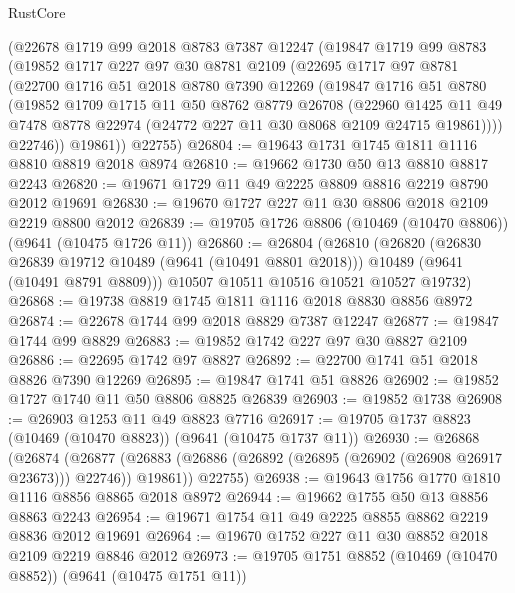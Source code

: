 \begin{lexlean}{RustCore}
\begin{coremodule}
    (@22678
      @1719
      @99
      @2018
      @8783
      @7387
      @12247
      (@19847
        @1719
        @99
        @8783
        (@19852
          @1717
          @227
          @97
          @30
          @8781
          @2109
          (@22695
            @1717
            @97
            @8781
            (@22700
              @1716
              @51
              @2018
              @8780
              @7390
              @12269
              (@19847
                @1716
                @51
                @8780
                (@19852
                  @1709
                  @1715
                  @11
                  @50
                  @8762
                  @8779
                  @26708
                  (@22960
                    @1425
                    @11
                    @49
                    @7478
                    @8778
                    @22974
                    (@24772 @227 @11 @30 @8068 @2109 @24715 @19861))))
              @22746))
          @19861))
      @22755)
@26804 := @19643 @1731 @1745 @1811 @1116 @8810 @8819 @2018 @8974
@26810 := @19662 @1730 @50 @13 @8810 @8817 @2243
@26820 := @19671 @1729 @11 @49 @2225 @8809 @8816 @2219 @8790 @2012 @19691
@26830 := @19670 @1727 @227 @11 @30 @8806 @2018 @2109 @2219 @8800 @2012
@26839 := @19705 @1726 @8806 (@10469 (@10470 @8806)) (@9641 (@10475 @1726 @11))
@26860 := @26804
    (@26810
      (@26820
        (@26830 @26839 @19712 @10489 (@9641 (@10491 @8801 @2018)))
        @10489
        (@9641 (@10491 @8791 @8809)))
      @10507
      @10511
      @10516
      @10521
      @10527
      @19732)
@26868 := @19738 @8819 @1745 @1811 @1116 @2018 @8830 @8856 @8972
@26874 := @22678 @1744 @99 @2018 @8829 @7387 @12247
@26877 := @19847 @1744 @99 @8829
@26883 := @19852 @1742 @227 @97 @30 @8827 @2109
@26886 := @22695 @1742 @97 @8827
@26892 := @22700 @1741 @51 @2018 @8826 @7390 @12269
@26895 := @19847 @1741 @51 @8826
@26902 := @19852 @1727 @1740 @11 @50 @8806 @8825 @26839
@26903 := @19852 @1738
@26908 := @26903 @1253 @11 @49 @8823 @7716
@26917 := @19705 @1737 @8823 (@10469 (@10470 @8823)) (@9641 (@10475 @1737 @11))
@26930 := @26868
    (@26874
      (@26877 (@26883 (@26886 (@26892 (@26895 (@26902 (@26908 @26917 @23673))) @22746)) @19861))
      @22755)
@26938 := @19643 @1756 @1770 @1810 @1116 @8856 @8865 @2018 @8972
@26944 := @19662 @1755 @50 @13 @8856 @8863 @2243
@26954 := @19671 @1754 @11 @49 @2225 @8855 @8862 @2219 @8836 @2012 @19691
@26964 := @19670 @1752 @227 @11 @30 @8852 @2018 @2109 @2219 @8846 @2012
@26973 := @19705 @1751 @8852 (@10469 (@10470 @8852)) (@9641 (@10475 @1751 @11))

\end{coremodule}
\end{lexlean}

